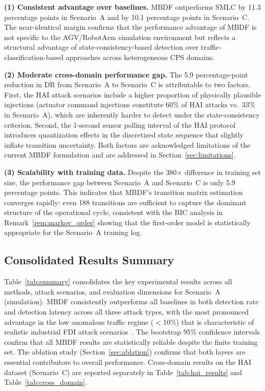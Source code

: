 \documentclass[manuscript,screen,review]{acmart}
\begin{document}
\textbf{(1) Consistent advantage over baselines.}
MBDF outperforms SMLC by 11.3 percentage points in
Scenario~A and by 10.1 percentage points in Scenario~C.
The near-identical margin confirms that the performance
advantage of MBDF is not specific to the AGV/RobotArm
simulation environment but reflects a structural advantage
of state-consistency-based detection over
traffic-classification-based approaches across
heterogeneous CPS domains.

\textbf{(2) Moderate cross-domain performance gap.}
The 5.9 percentage-point reduction in
$\overline{\mathrm{DR}}$ from Scenario~A to Scenario~C
is attributable to two factors. First, the HAI attack
scenarios include a higher proportion of physically
plausible injections (actuator command injections
constitute 60\% of HAI attacks vs.\ 33\% in Scenario~A),
which are inherently harder to detect under the
state-consistency criterion. Second, the 1-second sensor
polling interval of the HAI protocol introduces
quantization effects in the discretized state sequence
that slightly inflate transition uncertainty. Both factors
are acknowledged limitations of the current MBDF
formulation and are addressed in
Section~\ref{sec:limitations}.

\textbf{(3) Scalability with training data.}
Despite the 380$\times$ difference in training set size,
the performance gap between Scenario~A and Scenario~C is
only 5.9 percentage points. This indicates that MBDF's
transition matrix estimation converges rapidly: even 188
transitions are sufficient to capture the dominant
structure of the operational cycle, consistent with the
BIC analysis in Remark~\ref{rem:markov_order} showing
that the first-order model is statistically appropriate
for the Scenario~A training log.
\subsection{Consolidated Results Summary}
\label{sec:summary_table}

Table~\ref{tab:summary} consolidates the key experimental
results across all methods, attack scenarios, and evaluation
dimensions for Scenario~A (simulation). MBDF consistently
outperforms all baselines in both detection rate and
detection latency across all three attack types, with the
most pronounced advantage in the low anomalous traffic
regime ($<$10\%) that is characteristic of realistic
industrial FDI attack scenarios~\cite{ref26}. The bootstrap
95\% confidence intervals confirm that all MBDF results are
statistically reliable despite the finite training set. The
ablation study (Section~\ref{sec:ablation}) confirms that
both layers are essential contributors to overall
performance. Cross-domain results on the HAI dataset
(Scenario~C) are reported separately in
Table~\ref{tab:hai_results} and Table~\ref{tab:cross_domain}.
\end{document}
